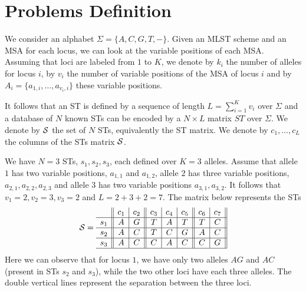 \documentclass[10pt]{llncs}
\begin{document}
\section{Problems Definition}
\label{sec:problem}

We consider an alphabet $\Sigma = \{A,C,G,T,-\}$. Given an MLST scheme and an MSA for each locus, we can look at the variable positions of each MSA. Assuming that loci are labeled from $1$ to $K$, we denote by $k_i$ the number of alleles for locus $i$, by $v_i$ the number of variable positions of the MSA of locus $i$ and by $A_i=\{a_{1,i},\dots,a_{v_i,i}\}$ these variable positions.

It follows that an ST is defined by a sequence of length $L = \sum_{i=1}^K v_i$ over $\Sigma$ and a database of $N$ known STs can be encoded by a $N\times L$ matrix $ST$ over $\Sigma$. We denote by $\cal S$ the set of $N$ STs, equivalently the ST matrix. We denote by $c_1,\dots,c_L$ the columns of the STs matrix $\cal S$.

\begin{example}
    \label{ex:inputMLST}
    We have $N=3$ STs, $s_1,s_2,s_3$, each defined over $K=3$ alleles. Assume that allele $1$ has two variable positions, $a_{1,1}$ and $a_{1,2}$, allele $2$ has three variable positions, $a_{2,1},a_{2,2},a_{2,3}$ and allele $3$ has two variable positions $a_{3,1},a_{3,2}$. It follows that $v_1=2, v_2=3, v_3=2$ and $L=2+3+2=7$. The matrix below represents the STs
    $${\cal S} = 
    \begin{array}{c||c|c||c|c|c||c|c||}
    & c_1 & c_2 & c_3 & c_4 & c_5 & c_6 & c_7 \\ \hline
    s_1 & A & G & T & A & T & T & C \\ \hline
    s_2 & A & C & T & C & G & A & C \\ \hline
    s_3 & A & C & C & A & C & C & G \\ \hline
    \end{array}
    $$
    Here we can observe that for locus $1$, we have only two alleles $AG$ and $AC$ (present in STs $s_2$ and $s_3$), while the two other loci have each three alleles. The double vertical lines represent the separation between the three loci. 
\end{example}

\end{document}
